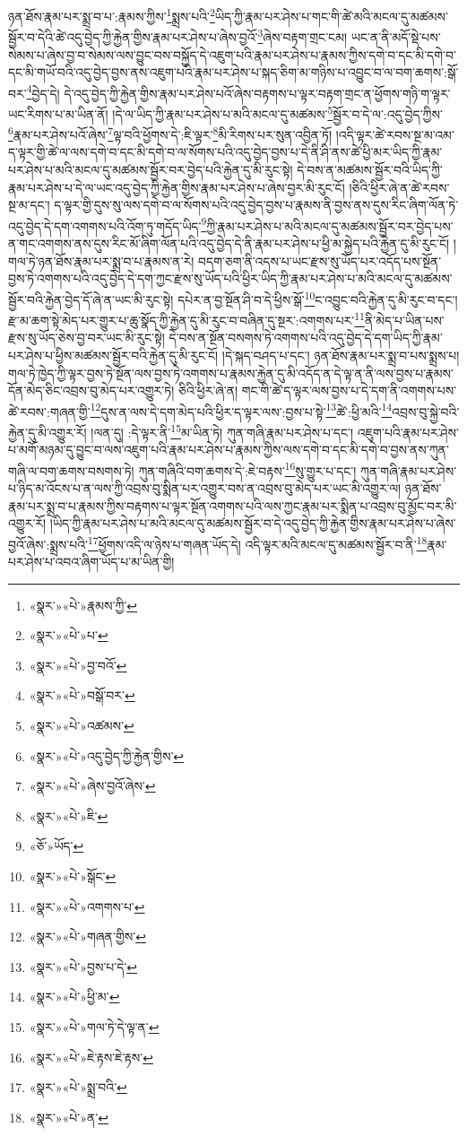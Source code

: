 ཉན་ཐོས་རྣམ་པར་སྨྲ་བ་པ་:རྣམས་ཀྱིས་\footnote{«སྣར་»«པེ་»རྣམས་ཀྱི་}སྨྲས་པའི་\footnote{«སྣར་»«པེ་»པ་}ཡིད་ཀྱི་རྣམ་པར་ཤེས་པ་གང་གི་ཚེ་མའི་མངལ་དུ་མཚམས་སྦྱོར་བ་དེའི་ཚེ་འདུ་བྱེད་ཀྱི་རྐྱེན་གྱིས་རྣམ་པར་ཤེས་པ་ཞེས་བྱའོ་\footnote{«སྣར་»«པེ་»བྱ་བའོ་}ཞེས་བརྟག་གྲང་ངམ། ཡང་ན་ནི་མདོ་སྡེ་པས་སེམས་པ་ཞེས་བྱ་བ་སེམས་ལས་བྱུང་བས་བསྐྱོད་དེ་འཇུག་པའི་རྣམ་པར་ཤེས་པ་རྣམས་ཀྱིས་དགེ་བ་དང་མི་དགེ་བ་དང་མི་གཡོ་བའི་འདུ་བྱེད་བྱས་ནས་འཇུག་པའི་རྣམ་པར་ཤེས་པ་སྐད་ཅིག་མ་གཉིས་པ་འབྱུང་བ་ལ་བག་ཆགས་:སྒོ་བར་\footnote{«སྣར་»«པེ་»བསྒོ་བར་}བྱེད་དེ། དེ་འདུ་བྱེད་ཀྱི་རྐྱེན་གྱིས་རྣམ་པར་ཤེས་པའོ་ཞེས་བརྟགས་པ་ལྟར་བརྟག་གྲང་ན་ཕྱོགས་གཉི་ག་ལྟར་ཡང་རིགས་པ་མ་ཡིན་ནོ། །དེ་ལ་ཡིད་ཀྱི་རྣམ་པར་ཤེས་པ་མའི་མངལ་དུ་མཚམས་\footnote{«སྣར་»«པེ་»འཚམས་}སྦྱོར་བ་དེ་ལ་:འདུ་བྱེད་ཀྱིས་\footnote{«སྣར་»«པེ་»འདུ་བྱེད་ཀྱི་རྐྱེན་གྱིས་}རྣམ་པར་ཤེས་པའོ་ཞེས་\footnote{«སྣར་»«པེ་»ཞེས་བྱའོ་ཞེས་}ལྟ་བའི་ཕྱོགས་དེ་:ཇི་ལྟར་\footnote{«སྣར་»«པེ་»ཇི་}མི་རིགས་པར་སུན་འབྱིན་ཏོ། །འདི་ལྟར་ཚེ་རབས་སྔ་མ་འམ་ད་ལྟར་གྱི་ཚེ་ལ་ལས་དགེ་བ་དང་མི་དགེ་བ་ལ་སོགས་པའི་འདུ་བྱེད་བྱས་པ་དེ་ནི་ཤི་ནས་ཚེ་ཕྱི་མར་ཡིད་ཀྱི་རྣམ་པར་ཤེས་པ་མའི་མངལ་དུ་མཚམས་སྦྱོར་བར་བྱེད་པའི་རྐྱེན་དུ་མི་རུང་སྟེ། དེ་བས་ན་མཚམས་སྦྱོར་བའི་ཡིད་ཀྱི་རྣམ་པར་ཤེས་པ་དེ་ལ་ཡང་འདུ་བྱེད་ཀྱི་རྐྱེན་གྱིས་རྣམ་པར་ཤེས་པ་ཞེས་བྱར་མི་རུང་ངོ། །ཅིའི་ཕྱིར་ཞེ་ན་ཚེ་རབས་སྔ་མ་དང་། ད་ལྟར་གྱི་དུས་སུ་ལས་དགེ་བ་ལ་སོགས་པའི་འདུ་བྱེད་བྱས་པ་རྣམས་ནི་བྱས་ནས་དུས་རིང་ཞིག་ལོན་ཏེ་འདུ་བྱེད་དེ་དག་འགགས་པའི་འོག་ཏུ་གདོད་ཡིད་\footnote{«ཅོ་»ཡོད་}ཀྱི་རྣམ་པར་ཤེས་པ་མའི་མངལ་དུ་མཚམས་སྦྱོར་བར་བྱེད་པས་ན་གང་འགགས་ནས་དུས་རིང་མོ་ཞིག་ལོན་པའི་འདུ་བྱེད་དེ་ནི་རྣམ་པར་ཤེས་པ་ཕྱི་མ་སྐྱེད་པའི་རྐྱེན་དུ་མི་རུང་ངོ། །གལ་ཏེ་ཉན་ཐོས་རྣམ་པར་སྨྲ་བ་པ་རྣམས་ན་རེ། བདག་ཅག་ནི་འདས་པ་ཡང་རྫས་སུ་ཡོད་པར་འདོད་པས་སྔོན་བྱས་ཏེ་འགགས་པའི་འདུ་བྱེད་དེ་དག་ཀྱང་རྫས་སུ་ཡོད་པའི་ཕྱིར་ཡིད་ཀྱི་རྣམ་པར་ཤེས་པ་མའི་མངལ་དུ་མཚམས་སྦྱོར་བའི་རྐྱེན་བྱེད་དོ་ཞེ་ན་ཡང་མི་རུང་སྟེ། དཔེར་ན་བྱ་སྔོན་ཤི་བ་དེ་ཕྱིས་སྒོ་\footnote{«སྣར་»«པེ་»སྒོང་}ང་འབྱུང་བའི་རྐྱེན་དུ་མི་རུང་བ་དང་། རྫ་མ་ཆག་སྟེ་མེད་པར་གྱུར་པ་ཆུ་སྣོད་ཀྱི་རྐྱེན་དུ་མི་རུང་བ་བཞིན་དུ་སྔར་:འགགས་པར་\footnote{«སྣར་»«པེ་»འགགས་པ་}ནི་མེད་པ་ཡིན་པས་རྫས་སུ་ཡོད་ཅེས་བྱ་བར་ཡང་མི་རུང་སྟེ། དེ་བས་ན་སྔོན་བསགས་ཏེ་འགགས་པའི་འདུ་བྱེད་དེ་དག་ཡིད་ཀྱི་རྣམ་པར་ཤེས་པ་ཕྱིས་མཚམས་སྦྱོར་བའི་རྐྱེན་དུ་མི་རུང་ངོ། །དེ་སྐད་བཤད་པ་དང་། ཉན་ཐོས་རྣམ་པར་སྨྲ་བ་པས་སྨྲས་པ། གལ་ཏེ་ཁྱེད་ཀྱི་ལྟར་བྱས་ཏེ་སྔོན་ལས་བྱས་ཏེ་འགགས་པ་རྣམས་རྐྱེན་དུ་མི་འདོད་ན་དེ་ལྟ་ན་ནི་ལས་བྱས་པ་རྣམས་དོན་མེད་ཅིང་འབྲས་བུ་མེད་པར་འགྱུར་ཏེ། ཅིའི་ཕྱིར་ཞེ་ན། གང་གི་ཚེ་ད་ལྟར་ལས་བྱས་པ་དེ་དག་ནི་འགགས་པས་ཚེ་རབས་:གཞན་གྱི་\footnote{«སྣར་»«པེ་»གཞན་གྱིས་}དུས་ན་ལས་དེ་དག་མེད་པའི་ཕྱིར་ད་ལྟར་ལས་:བྱས་པ་སྟེ་\footnote{«སྣར་»«པེ་»བྱས་པ་དེ་}ཚེ་:ཕྱི་མའི་\footnote{«སྣར་»«པེ་»ཕྱི་མ་}འབྲས་བུ་སྐྱེ་བའི་རྐྱེན་དུ་མི་འགྱུར་རོ། །ལན་དུ། :དེ་ལྟར་ནི་\footnote{«སྣར་»«པེ་»གལ་ཏེ་དེ་ལྟ་ན་}མ་ཡིན་ཏེ། ཀུན་གཞི་རྣམ་པར་ཤེས་པ་དང་། འཇུག་པའི་རྣམ་པར་ཤེས་པ་མགོ་མཉམ་དུ་བྱུང་བ་ལས་འཇུག་པའི་རྣམ་པར་ཤེས་པ་རྣམས་ཀྱིས་ལས་དགེ་བ་དང་མི་དགེ་བ་བྱས་ནས་ཀུན་གཞི་ལ་བག་ཆགས་བསགས་ཏེ། ཀུན་གཞིའི་བག་ཆགས་དེ་:ཇེ་བརྟས་\footnote{«སྣར་»«པེ་»ཇེ་རྟས་ཇེ་རྟས་}སུ་གྱུར་པ་དང་། ཀུན་གཞི་རྣམ་པར་ཤེས་པ་ཉིད་མ་འོངས་པ་ན་ལས་ཀྱི་འབྲས་བུ་སྨིན་པར་འགྱུར་བས་ན་འབྲས་བུ་མེད་པར་ཡང་མི་འགྱུར་ལ། ཉན་ཐོས་རྣམ་པར་སྨྲ་བ་པ་རྣམས་ཀྱིས་བརྟགས་པ་ལྟར་སྔོན་འགགས་པའི་ལས་ཀྱང་རྣམ་པར་སྨིན་པ་འབྲས་བུ་མྱོང་བར་མི་འགྱུར་རོ། །ཡིད་ཀྱི་རྣམ་པར་ཤེས་པ་མའི་མངལ་དུ་མཚམས་སྦྱོར་བ་དེ་འདུ་བྱེད་ཀྱི་རྐྱེན་གྱིས་རྣམ་པར་ཤེས་པ་ཞེས་བྱའོ་ཞེས་:སྨྲས་པའི་\footnote{«སྣར་»«པེ་»སྨྲ་བའི་}ཕྱོགས་འདི་ལ་ཉེས་པ་གཞན་ཡོད་དེ། འདི་ལྟར་མའི་མངལ་དུ་མཚམས་སྦྱོར་བ་ནི་\footnote{«སྣར་»«པེ་»ན་}རྣམ་པར་ཤེས་པ་འབའ་ཞིག་ཡོད་པ་མ་ཡིན་གྱི། 